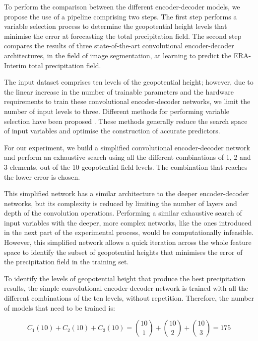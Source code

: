 \documentclass[twocol]{ametsoc}
\begin{document}
To perform the comparison between the different encoder-decoder models, we propose the use of a pipeline comprising two steps. The first step performs a variable selection process to determine the geopotential height levels that minimise the error at forecasting the total precipitation field. The second step compares the results of three state-of-the-art convolutional encoder-decoder architectures, in the field of image segmentation, at learning to predict the ERA-Interim total precipitation field.

The input dataset comprises ten levels of the geopotential height; however, due to the linear increase in the number of trainable parameters and the hardware requirements to train these convolutional encoder-decoder networks, we limit the number of input levels to three. Different methods for performing variable selection have been proposed \citep{saeys2007review}. These methods generally reduce the search space of input variables and optimise the construction of accurate predictors. 

For our experiment, we build a simplified convolutional encoder-decoder network and perform an exhaustive search using all the different combinations of 1, 2 and 3 elements, out of the 10 geopotential field levels. The combination that reaches the lower error is chosen. 

This simplified network has a similar architecture to the deeper encoder-decoder networks, but its complexity is reduced by limiting the number of layers and depth of the convolution operations. Performing a similar exhaustive search of input variables with the deeper, more complex networks, like the ones introduced in the next part of the experimental process, would be computationally infeasible. However, this simplified network allows a quick iteration across the whole feature space to identify the subset of geopotential heights that minimises the error of the precipitation field in the training set.

To identify the levels of geopotential height that produce the best precipitation results, the simple convolutional encoder-decoder network is trained with all the different combinations of the ten levels, without repetition. Therefore, the number of models that need to be trained is:

\begin{equation}
C_1(10) + C_2(10) + C_3(10) = \binom{10}{1} + \binom{10}{2} + \binom{10}{3} = 175
\end{equation}
\end{document}
